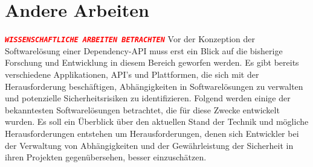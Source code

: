 \section{Andere Arbeiten} \label{sec:Andere}
    \textcolor{red}{
        \textbf{\textit{\texttt{WISSENSCHAFTLICHE ARBEITEN BETRACHTEN}}}
    }
    Vor der Konzeption der Softwarelösung einer Dependency-API muss erst ein Blick auf die bisherige Forschung und Entwicklung in diesem Bereich geworfen werden.
    Es gibt bereits verschiedene Applikationen, API's und Plattformen, die sich mit der Herausforderung beschäftigen, Abhängigkeiten in Softwarelösungen zu verwalten und potenzielle Sicherheitsrisiken zu identifizieren.
    Folgend werden einige der bekanntesten Softwarelösungen betrachtet, die für diese Zwecke entwickelt wurden.
    Es soll ein Überblick über den aktuellen Stand der Technik und mögliche Herausforderungen entstehen um Herausforderungen, denen sich Entwickler bei der Verwaltung von Abhängigkeiten und der Gewährleistung der Sicherheit in ihren Projekten gegenübersehen, besser einzuschätzen.
    
    
    
    
